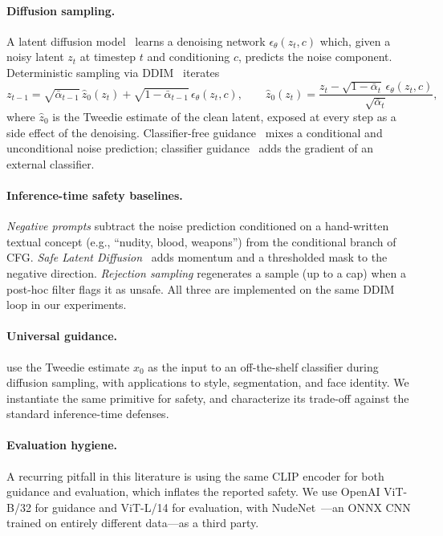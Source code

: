 \documentclass{article}
\begin{document}
\paragraph{Diffusion sampling.} A latent diffusion model~\citep{rombach2022ldm} learns a denoising network $\epsilon_\theta(z_t, c)$ which, given a noisy latent $z_t$ at timestep $t$ and conditioning $c$, predicts the noise component. Deterministic sampling via DDIM~\citep{song2021ddim} iterates
\begin{equation}
z_{t-1} = \sqrt{\bar\alpha_{t-1}}\,\hat{z}_0(z_t) + \sqrt{1-\bar\alpha_{t-1}}\,\epsilon_\theta(z_t, c),
\qquad
\hat{z}_0(z_t) = \frac{z_t - \sqrt{1-\bar\alpha_t}\,\epsilon_\theta(z_t, c)}{\sqrt{\bar\alpha_t}},
\label{eq:ddim}
\end{equation}
where $\hat{z}_0$ is the Tweedie estimate of the clean latent, exposed at every step as a side effect of the denoising. Classifier-free guidance~\citep{ho2022cfg} mixes a conditional and unconditional noise prediction; classifier guidance~\citep{dhariwal2021diffusion} adds the gradient of an external classifier.

\paragraph{Inference-time safety baselines.} \emph{Negative prompts} subtract the noise prediction conditioned on a hand-written textual concept (e.g., ``nudity, blood, weapons'') from the conditional branch of CFG. \emph{Safe Latent Diffusion}~\citep{schramowski2023sld} adds momentum and a thresholded mask to the negative direction. \emph{Rejection sampling} regenerates a sample (up to a cap) when a post-hoc filter flags it as unsafe. All three are implemented on the same DDIM loop in our experiments.

\paragraph{Universal guidance.} \citet{bansal2023universal} use the Tweedie estimate $\hat{x}_0$ as the input to an off-the-shelf classifier during diffusion sampling, with applications to style, segmentation, and face identity. We instantiate the same primitive for safety, and characterize its trade-off against the standard inference-time defenses.

\paragraph{Evaluation hygiene.} A recurring pitfall in this literature is using the same CLIP encoder for both guidance and evaluation, which inflates the reported safety. We use OpenAI ViT-B/32 for guidance and ViT-L/14 for evaluation, with NudeNet~\citep{nudenet}---an ONNX CNN trained on entirely different data---as a third party.
\end{document}
